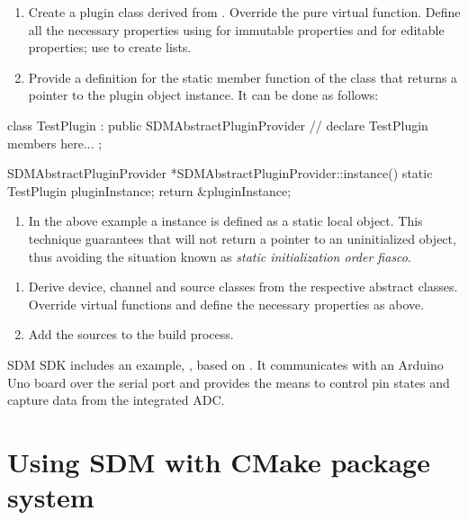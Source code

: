 \documentclass[a4paper,12pt,twoside,extrafontsizes]{memoir}
\begin{document}
\begin{enumerate}
	\item Create a plugin class derived from . Override the  pure virtual function. Define all the necessary properties using  for immutable properties and  for editable properties; use  to create lists.
	\item Provide a definition for the  static member function of the  class that returns a pointer to the plugin object instance. It can be done as follows:
\end{enumerate}
	
\begin{breakshellcmds}\begin{ccode}
class TestPlugin : public SDMAbstractPluginProvider {
// declare TestPlugin members here...
};

SDMAbstractPluginProvider *SDMAbstractPluginProvider::instance() {
    static TestPlugin pluginInstance;
    return &pluginInstance;
}
\end{ccode}\end{breakshellcmds}

\begin{enumerate}[label={}]
	\item In the above example a  instance is defined as a static local object. This technique guarantees that  will not return a pointer to an uninitialized object, thus avoiding the situation known as \emph{static initialization order fiasco}.
\end{enumerate}
\begin{enumerate}[start=3]
	\item Derive device, channel and source classes from the respective abstract classes. Override virtual functions and define the necessary properties as above.
	\item Add the  sources to the build process.
\end{enumerate}

SDM SDK includes an example, , based on . It communicates with an Arduino Uno board over the serial port and provides the means to control pin states and capture data from the integrated ADC.

\section{Using SDM with CMake package system}
\label{sec:cmakeconfig}
\end{document}
